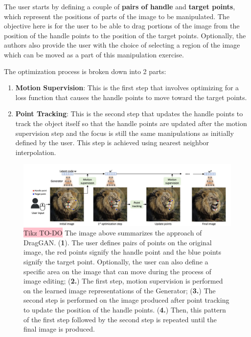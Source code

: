The user starts by defining a couple of \textbf{pairs of handle} and \textbf{target points}, which represent the positions of parts of the image to be manipulated.  The objective here is for the user to be able to drag portions of the image from the position of the handle points to the position of the target points. Optionally, the authors also provide the user with the choice of selecting a region of the image which can be moved as a part of this manipulation exercise. 

The optimization process is broken down into 2 parts:

\begin{enumerate}
    \item \textbf{Motion Supervision}: This is the first step that involves optimizing for a loss function that causes the handle points to move toward the target points.
    \vspace{1 pt}
    \item \textbf{Point Tracking}: This is the second step that updates the handle points to track the object itself so that the handle points are updated after the motion supervision step and the focus is still the same manipulations as initially defined by the user. This step is achieved using nearest neighbor interpolation.

\end{enumerate}

\begin{figure}[!htbp]
    \centering
    \includegraphics[width=1\linewidth]{tikz/DRAG GAN.png}
    \caption{{\color{red}\colorbox{pink}{Tikz TO-DO}} The image above summarizes the approach of DragGAN. (\textbf{1}). The user defines pairs of points on the original image, the red points signify the handle point and the blue points signify the target point. Optionally, the user can also define a specific area on the image that can move during the process of image editing; (\textbf{2.}) The first step, motion supervision is performed on the learned image representations of the Generator; (\textbf{3.}) The second step is performed on the image produced after point tracking to update the position of the handle points. (\textbf{4.}) Then, this pattern of the first step followed by the second step is repeated until the final image is produced.}
    \label{fig:drag-gan}
\end{figure}

